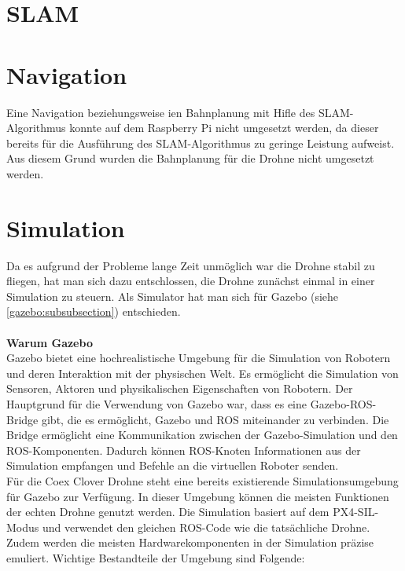 \section{SLAM} \label{slam:section}
\section{Navigation} \label{navigation:section} 
Eine Navigation beziehungsweise ien Bahnplanung mit Hifle des \ac{SLAM}-Algorithmus konnte auf dem Raspberry Pi nicht umgesetzt werden, da dieser bereits für die Ausführung des \ac{SLAM}-Algorithmus zu geringe Leistung aufweist. Aus diesem Grund wurden die Bahnplanung für die Drohne nicht umgesetzt werden.



\section{Simulation} \label{simulation:section}
Da es aufgrund der Probleme lange Zeit unmöglich war die Drohne stabil zu fliegen, hat man  sich dazu entschlossen, die Drohne zunächst einmal in einer Simulation zu steuern. Als Simulator hat man sich für Gazebo (siehe \ref{gazebo:subsubsection}) entschieden. \\
\\
\textbf{Warum Gazebo} \\
Gazebo bietet eine hochrealistische Umgebung für die Simulation von Robotern und deren Interaktion mit der physischen Welt. Es ermöglicht die Simulation von Sensoren, Aktoren und physikalischen Eigenschaften von Robotern. Der Hauptgrund für die Verwendung von Gazebo war, dass es eine Gazebo-ROS-Bridge gibt, die es ermöglicht, Gazebo und ROS miteinander zu verbinden. Die Bridge ermöglicht eine Kommunikation zwischen der Gazebo-Simulation und den ROS-Komponenten. Dadurch können ROS-Knoten Informationen aus der Simulation empfangen und Befehle an die virtuellen Roboter senden. \\

Für die Coex Clover Drohne steht eine bereits existierende Simulationsumgebung für Gazebo zur Verfügung. In dieser Umgebung können die meisten Funktionen der echten Drohne genutzt werden. Die Simulation basiert auf dem PX4-SIL-Modus und verwendet den gleichen ROS-Code wie die tatsächliche Drohne. Zudem werden die meisten Hardwarekomponenten in der Simulation präzise emuliert. Wichtige Bestandteile der Umgebung sind Folgende:

